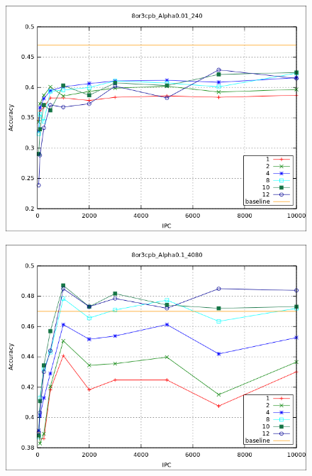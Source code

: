 			\begin{figure}[htbp]
				\centering
				\includegraphics[scale=0.6]{img/resultados/sinteticas/worst_expon_8or3cpb_Alpha0,01_240.png}
				\caption[Sintéticas exponencial peor resultado]{}
				\label{fig: Sinteticas-expon-bajo}
			\end{figure}
			
			\begin{figure}[htbp]
				\centering
				\includegraphics[scale=0.6]{img/resultados/sinteticas/best_bootstrap_8or3cpb_Alpha0,1_4080.png}
				\caption[Sintéticas bootstrap mejor resultado]{}
				\label{fig: Sinteticas-bootstrap-mejor}
			\end{figure}
	
